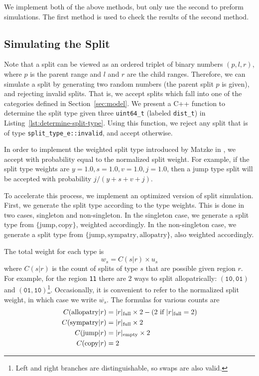 \documentclass{article}
\begin{document}
We implement both of the above methods, but only use the second to preform
simulations.
The first method is used to check the results of the second method.

\subsection{Simulating the Split}

Note that a split can be viewed as an ordered triplet of binary numbers \(
(p,l,r) \), where $p$ is the parent range and $l$ and $r$ are the child ranges.
Therefore, we can simulate a split by generating two random numbers (the parent
split $p$ is given), and rejecting invalid splits.
That is, we accept splits which fall into one of the categories defined in
Section~\ref{sec:model}.
We present a C++ function to determine the split type given three
\texttt{uint64_t} (labeled \texttt{dist_t}) in
Listing~\ref{lst:determine-split-type}.
Using this function, we reject any split that is of type
\texttt{split_type_e::invalid}, and accept otherwise.

In order to implement the weighted split type introduced by Matzke in
\cite{ModelSelectionMatzke2014}, we accept with probability equal to the
normalized split weight.
For example, if the split type weights are $y = 1.0, s = 1.0, v = 1.0, j=1.0$,
then a jump type split will be accepted with probability $j/(y + s + v +
j)$.

To accelerate this process, we implement an optimized version of split
simulation.
First, we generate the split type according to the type weights.
This is done in two cases, singleton and non-singleton.
In the singleton case, we generate a split type from $\{\text{jump},
\text{copy}\}$, weighted accordingly.
In the non-singleton case, we generate a split type from $\{\text{jump},
\text{sympatry}, \text{allopatry}\}$, also weighted accordingly.

The total weight for each type is
\begin{equation}
	w_s = C(s|r) \times u_s
\end{equation}
where $C(s|r)$ is the count of splits of type $s$ that are
possible given region $r$.
For example, for the region \texttt{11} there are 2 ways to split
allopatrically: $(\texttt{10}, \texttt{01})$ and $(\texttt{01},
\texttt{10})$\footnote{Left and right branches are distinguishable, so swaps
	are also valid.}\footnotemark.
Occasionally, it is convenient to refer to the normalized split weight, in
which case we write \( \overline{w_s} \).
The formulas for various counts are
\begin{align*}
  C(\text{allopatry}|r) & =
  |r|_\text{full} \times 2 - (2 \text{ if } |r|_\text{full} = 2) \\
  C(\text{sympatry}|r)  & = |r|_\text{full} \times 2           \\ C(\text{jump}|r) & =
  |r|_\text{empty} \times 2                                    \\ C(\text{copy}|r) & = 2 \\
\end{align*}
\end{document}
